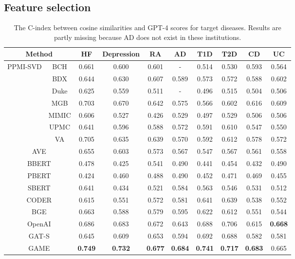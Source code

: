 \documentclass{article}
\begin{document}
\subsection{Feature selection}


\begin{table}[H]
\centering
\setlength{\tabcolsep}{2pt}
\begin{tabular}{cc|cccccccc}
\hline
 \multicolumn{2}{c|}{\textbf{Method}}& \textbf{HF} & \textbf{Depression} & \textbf{RA} & \textbf{AD} & \textbf{T1D} & \textbf{T2D} & \textbf{CD} & \textbf{UC} \\
\hline
\multirow{7}{*}{{PPMI-SVD}}
& {BCH} & 0.661 & 0.600 & 0.601 & - & 0.514 & 0.530 & 0.593 & 0.564 \\
& {BDX} & 0.644 & 0.630 & 0.607 & 0.589 & 0.573 & 0.572 & 0.588 & 0.602 \\
& {Duke} & 0.625 & 0.559 & 0.511 & - & 0.496 & 0.515 & 0.504 & 0.506 \\
& {MGB} & 0.703 & 0.670 & 0.642 & 0.575 & 0.566 & 0.602 & 0.616 & 0.609 \\
& {MIMIC} & 0.606 & 0.527 & 0.426 & 0.529 & 0.497 & 0.529 & 0.506 & 0.506 \\
& {UPMC} & 0.641 & 0.596 & 0.588 & 0.572 & 0.591 & 0.610 & 0.547 & 0.550 \\
& {VA} & 0.705 & 0.635 & 0.639 & 0.570 & 0.592 & 0.612 & 0.578 & 0.572 \\
\multicolumn{2}{c|}{{AVE}} & 0.655 & 0.603 & 0.573 & 0.567 & 0.547 & 0.567 & 0.561 & 0.558 \\
\hline
\multicolumn{2}{c|}{{BBERT}} & 0.478 & 0.425 & 0.541 & 0.490 & 0.441 & 0.454 & 0.432 & 0.490 \\
\multicolumn{2}{c|}{{PBERT}} & 0.424 & 0.460 & 0.488 & 0.490 & 0.452 & 0.471 & 0.469 & 0.455 \\
\multicolumn{2}{c|}{{SBERT}} & 0.641 & 0.434 & 0.521 & 0.584 & 0.563 & 0.546 & 0.531 & 0.512 \\
\hline
\multicolumn{2}{c|}{{CODER}} & 0.615 & 0.551 & 0.572 & 0.581 & 0.641 & 0.639 & 0.538 & 0.552 \\
\multicolumn{2}{c|}{{BGE}} & 0.663 & 0.588 & 0.579 & 0.595 & 0.622 & 0.612 & 0.551 & 0.544 \\
\multicolumn{2}{c|}{{OpenAI}} & 0.686 & 0.683 & 0.672 & 0.643 & 0.688 & 0.706 & 0.615 & \textbf{0.668} \\
\multicolumn{2}{c|}{GAT-S} & 0.645 & 0.609 & 0.653 & 0.594 & 0.692 & 0.688 & 0.582 & 0.581 \\
\multicolumn{2}{c|}{{GAME}} & \textbf{0.749} & \textbf{0.732} & \textbf{0.677} & \textbf{0.684} & \textbf{0.741} & \textbf{0.717} & \textbf{0.683} & 0.665 \\
\hline
\end{tabular}
\caption{The C-index between cosine similarities and GPT-4 scores for target diseases. Results are partly missing because AD does not exist in these institutions.}
\label{R3_}
\end{table}
\end{document}
